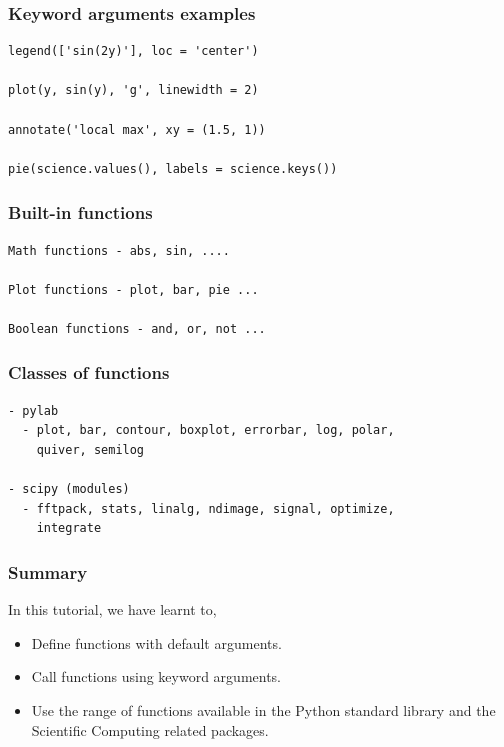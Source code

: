 \documentclass[presentation]{beamer}
\begin{document}
\begin{frame}[fragile]
\frametitle{Keyword arguments examples}
\label{sec-9}

\lstset{language=Python}
\begin{lstlisting}
legend(['sin(2y)'], loc = 'center')

plot(y, sin(y), 'g', linewidth = 2)

annotate('local max', xy = (1.5, 1))

pie(science.values(), labels = science.keys())
\end{lstlisting}
\end{frame}
\begin{frame}[fragile]
\frametitle{Built-in functions}
\label{sec-10}

\lstset{language=Python}
\begin{lstlisting}
Math functions - abs, sin, ....
 
Plot functions - plot, bar, pie ...
 
Boolean functions - and, or, not ...
\end{lstlisting}
\end{frame}
\begin{frame}[fragile]
\frametitle{Classes of functions}
\label{sec-11}

\lstset{language=Python}
\begin{lstlisting}
- pylab
  - plot, bar, contour, boxplot, errorbar, log, polar, 
    quiver, semilog

- scipy (modules)
  - fftpack, stats, linalg, ndimage, signal, optimize, 
    integrate
\end{lstlisting}
\end{frame}
\begin{frame}
\frametitle{Summary}
\label{sec-12}

 In this tutorial, we have learnt to, 


\begin{itemize}
\item Define functions with default arguments.
\item Call functions using keyword arguments.
\item Use the range of functions available in the Python standard library 
   and the Scientific Computing related packages.
\end{itemize}
\end{frame}
\end{document}
